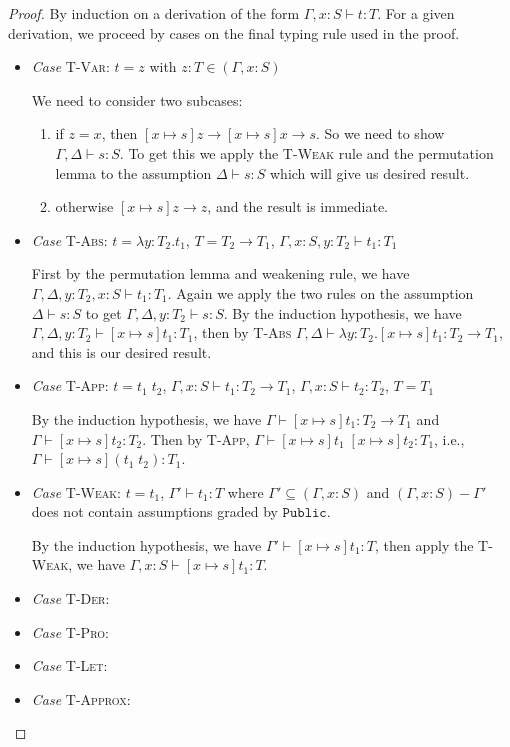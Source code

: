 \documentclass[conference]{IEEEtran}
\newcommand\lam[2]{\lambda #1.#2}
\newcommand\public{\texttt{Public}}
\begin{document}
\begin{proof}
	By induction on a derivation of the form $\Gamma,x:S\vdash t:T$. For a given derivation, we proceed by cases on the final typing rule used in the proof.
	\begin{itemize}		
		\item\textit{Case} \textsc{T-Var}: $t=z$ with $z:T\in(\Gamma,x:S)$
		
		We need to consider two subcases: 
		\begin{enumerate}
			\item if $z=x$, then $[x\mapsto s]z\to[x\mapsto s]x\to s$. So we need to show $\Gamma,\Delta\vdash s:S$. To get this we apply the \textsc{T-Weak} rule and the permutation lemma to the assumption $\Delta\vdash s:S$ which will give us desired result.
			\item otherwise $[x\mapsto s]z\to z$, and the result is immediate.
		\end{enumerate}	
		
		\item\textit{Case} \textsc{T-Abs}: $t=\lam{y:T_2}{t_1}$, $T=T_2\to T_1$, $\Gamma,x:S,y:T_2\vdash t_1:T_1$
		
		First by the permutation lemma and weakening rule, we have $\Gamma,\Delta,y:T_2,x:S\vdash t_1:T_1$. Again we apply the two rules on the assumption $\Delta\vdash s:S$ to get $\Gamma,\Delta,y:T_2\vdash s:S$. By the induction hypothesis, we have $\Gamma,\Delta,y:T_2\vdash [x\mapsto s]t_1:T_1$, then by \textsc{T-Abs} $\Gamma,\Delta\vdash \lam{y:T_2}{[x\mapsto s]t_1}:T_2\to T_1$, and this is our desired result.
		
		\item\textit{Case} \textsc{T-App}: $t=t_1\; t_2$, $\Gamma,x:S\vdash t_1:T_2\to T_1$, $\Gamma,x:S\vdash t_2:T_2$, $T=T_1$
		
		By the induction hypothesis, we have $\Gamma\vdash [x\mapsto s]t_1:T_2\to T_1$ and $\Gamma\vdash [x\mapsto s]t_2:T_2$. Then by \textsc{T-App}, $\Gamma\vdash [x\mapsto s]t_1\; [x\mapsto s]t_2:T_1$, i.e., $\Gamma\vdash [x\mapsto s](t_1\; t_2):T_1$.
		
		\item\textit{Case} \textsc{T-Weak}: $t=t_1$, $\Gamma'\vdash t_1:T$ where $\Gamma'\subseteq(\Gamma,x:S)$ and $(\Gamma,x:S)-\Gamma'$ does not contain assumptions graded by $\public$.
		
		By the induction hypothesis, we have $\Gamma'\vdash [x\mapsto s]t_1:T$, then apply the \textsc{T-Weak}, we have $\Gamma,x:S\vdash [x\mapsto s]t_1:T$.
		
		\item\textit{Case} \textsc{T-Der}:
		
		\item\textit{Case} \textsc{T-Pro}:
		
		\item\textit{Case} \textsc{T-Let}:
		
		\item\textit{Case} \textsc{T-Approx}:
	\end{itemize}
\end{proof}
\end{document}
